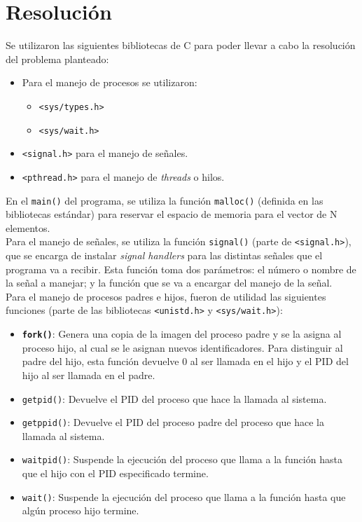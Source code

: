 \section{Resolución}

Se utilizaron las siguientes bibliotecas de C para poder llevar a cabo la resolución del problema planteado:
\begin{itemize}
    \item Para el manejo de procesos se utilizaron:
    \begin{itemize}
        \item \texttt{<sys/types.h>}
        \item \texttt{<sys/wait.h>}
    \end{itemize}
    \item \texttt{<signal.h>} para el manejo de señales.
    \item \texttt{<pthread.h>} para el manejo de \textit{threads} o hilos.\\
\end{itemize}

En el \texttt{main()} del programa, se utiliza la función \texttt{malloc()} (definida en las bibliotecas estándar) para reservar el espacio de memoria para el vector de N elementos.\\

Para el manejo de señales, se utiliza la función \texttt{signal()} (parte de \texttt{<signal.h>}), que se encarga de instalar \textit{signal handlers} para las distintas señales que el programa va a recibir. Esta función toma dos parámetros: el número o nombre de la señal a manejar; y la función que se va a encargar del manejo de la señal.\\ 

Para el manejo de procesos padres e hijos, fueron de utilidad las siguientes funciones (parte de las bibliotecas \texttt{<unistd.h>} y \texttt{<sys/wait.h>}):

\begin{itemize}
    \item \textbf{\texttt{fork()}}: Genera una copia de la imagen del proceso padre y se la asigna al proceso hijo, al cual se le asignan nuevos identificadores. Para distinguir al padre del hijo, esta función devuelve 0 al ser llamada en el hijo y el PID del hijo al ser llamada en el padre. 
    \item \texttt{getpid()}: Devuelve el PID del proceso que hace la llamada al sistema.
    \item \texttt{getppid()}: Devuelve el PID del proceso padre del proceso que hace la llamada al sistema.
    \item \texttt{waitpid()}: Suspende la ejecución del proceso que llama a la función hasta que el hijo con el PID especificado termine.
    \item \texttt{wait()}: Suspende la ejecución del proceso que llama a la función hasta que algún proceso hijo termine.\\
\end{itemize}

